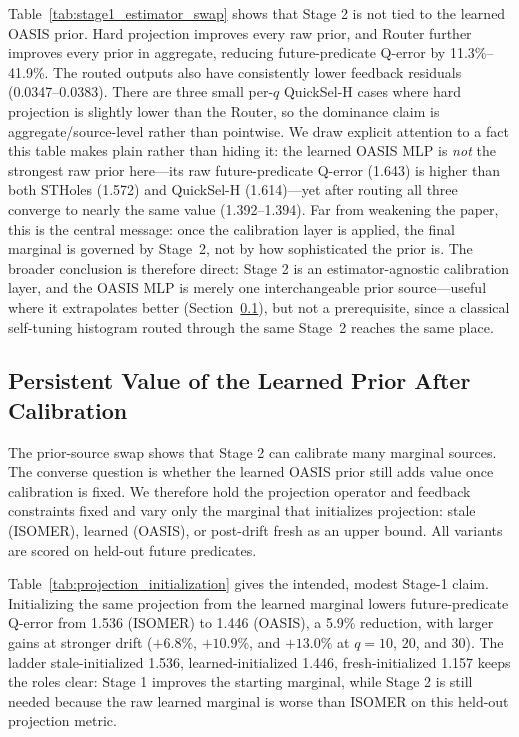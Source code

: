\documentclass[preprint,12pt]{elsarticle}
\newcommand{\oasisUseMaxWidthResize}[1]{%
  \renewcommand{\resizebox}[3]{\adjustbox{max width=#1}{##3}}%
}
\begin{document}


Table~\ref{tab:stage1_estimator_swap} shows that Stage 2 is not tied to the
learned OASIS prior. Hard projection improves every raw prior, and Router
further improves every prior in aggregate, reducing future-predicate
Q-error by 11.3\%--41.9\%. The routed outputs also have consistently lower
feedback residuals (0.0347--0.0383). There are three small per-$q$ QuickSel-H
cases where hard projection is slightly lower than the Router, so the dominance
claim is aggregate/source-level rather than pointwise. We draw explicit attention
to a fact this table makes plain rather than hiding it: the learned OASIS MLP is
\emph{not} the strongest raw prior here---its raw future-predicate Q-error
(1.643) is higher than both STHoles (1.572) and QuickSel-H (1.614)---yet after
routing all three converge to nearly the same value (1.392--1.394). Far from
weakening the paper, this is the central message: once the calibration layer is
applied, the final marginal is governed by Stage~2, not by how sophisticated the
prior is. The broader conclusion is therefore direct: Stage 2 is an
estimator-agnostic calibration layer, and the OASIS MLP is merely one
interchangeable prior source---useful where it extrapolates better
(Section~\ref{sec:projection-init}), but not a prerequisite, since a classical
self-tuning histogram routed through the same Stage~2 reaches the same place.

\subsection{Persistent Value of the Learned Prior After Calibration}
\label{sec:projection-init}

The prior-source swap shows that Stage 2 can calibrate many marginal sources.
The converse question is whether the learned OASIS prior still adds value once
calibration is fixed. We therefore hold the projection operator and feedback
constraints fixed and vary only the marginal that initializes projection: stale
(ISOMER), learned (OASIS), or post-drift fresh as an upper bound. All
variants are scored on held-out future predicates.

\begingroup
\oasisUseMaxWidthResize{.96\textwidth}

\endgroup

Table~\ref{tab:projection_initialization} gives the intended, modest Stage-1
claim. Initializing the same projection from the learned marginal lowers
future-predicate Q-error from 1.536 (ISOMER) to 1.446 (OASIS), a 5.9\%
reduction, with larger gains at stronger drift ($+6.8\%$, $+10.9\%$, and
$+13.0\%$ at $q=10$, $20$, and $30$). The ladder
stale-initialized 1.536, learned-initialized 1.446, fresh-initialized 1.157
keeps the roles clear: Stage 1 improves the starting marginal, while Stage 2 is
still needed because the raw learned marginal is worse than ISOMER on this
held-out projection metric.
\end{document}
